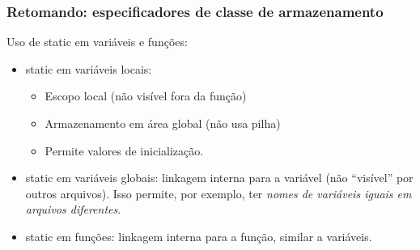 \documentclass{beamer}
\begin{document}
\begin{frame}
	\frametitle{Retomando: especificadores de classe de armazenamento}
		Uso de static em variáveis e funções:
	\vspace*{0.5cm}
	\begin{itemize}
	\item static em variáveis locais:
		\begin{itemize}
		\item Escopo local (não visível fora da função)
		\item Armazenamento em área global (não usa pilha)
		\item Permite valores de inicialização.
		\end{itemize}
	\item static em variáveis globais: linkagem interna para a variável (não ``visível'' por outros arquivos).  Isso permite, por exemplo, ter \textit{nomes de variáveis iguais em arquivos diferentes}.
	\item static em funções: linkagem interna para a função, similar a variáveis.
	\end{itemize}
\end{frame}

\end{document}
